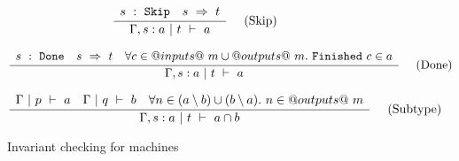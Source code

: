 \begin{figure*}
$$
\frac {\displaystyle 
    \begin{array}{lr}
        s ~:~ \mathtt{Skip}    &
        s ~\Rightarrow~ t
    \end{array}
} {\displaystyle  
     \Gamma, s : a  ~|~  t  ~\vdash~  a 
} \ 
\quad
\textrm{(Skip)}
$$

$$
\frac {\displaystyle 
    \begin{array}{lcr}
        s ~:~ \mathtt{Done}    &
        s ~\Rightarrow~ t                &
        \forall c \in @inputs@~m \cup @outputs@~m.~ \mathtt{Finished}~c \in a
    \end{array}
} {\displaystyle  
     \Gamma, s : a  ~|~  t  ~\vdash~  a 
} \ 
\quad
\textrm{(Done)}
$$

$$
\frac {\displaystyle 
    \begin{array}{lcr}
        \Gamma ~|~ p ~\vdash~ a      &
        \Gamma ~|~ q ~\vdash~ b      &
        \forall n \in (a \setminus b) \cup (b \setminus a).~ n \in @outputs@~m
    \end{array}
} {\displaystyle  
     \Gamma, s : a  ~|~  t  ~\vdash~  a \cap b 
} \ 
\quad
\textrm{(Subtype)}
$$


\caption{Invariant checking for machines}
\label{fig:invariants}
\end{figure*}

